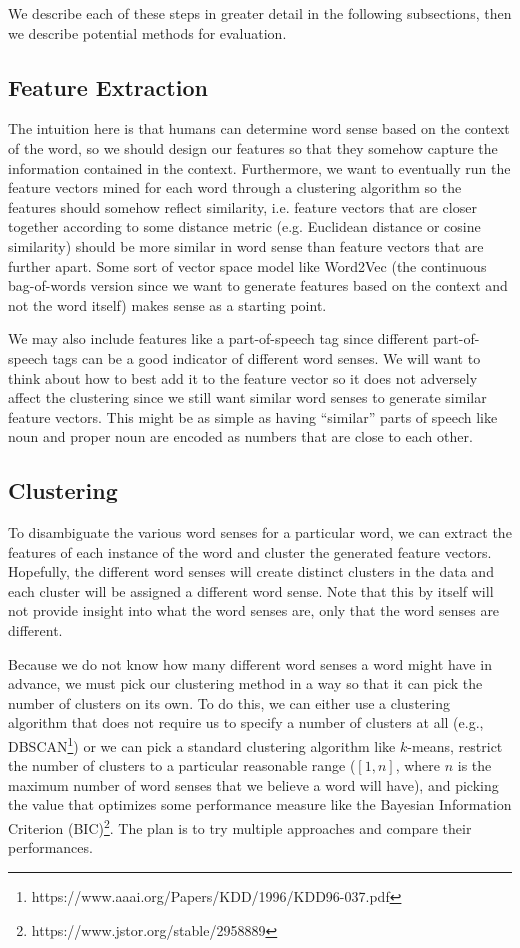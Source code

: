 \documentclass[11pt,letterpaper]{article}
\begin{document}
We describe each of these steps in greater detail in the following subsections, then we describe potential methods for evaluation.

\subsection{Feature Extraction}
The intuition here is that humans can determine word sense based on the context of the word, so we should design our features so that they somehow capture the information contained in the context. Furthermore, we want to eventually run the feature vectors mined for each word through a clustering algorithm so the features should somehow reflect similarity, i.e. feature vectors that are closer together according to some distance metric (e.g. Euclidean distance or cosine similarity) should be more similar in word sense than feature vectors that are further apart. Some sort of vector space model like Word2Vec (the continuous bag-of-words version since we want to generate features based on the context and not the word itself) makes sense as a starting point. 

We may also include features like a part-of-speech tag since different part-of-speech tags can be a good indicator of different word senses. We will want to think about how to best add it to the feature vector so it does not adversely affect the clustering since we still want similar word senses to generate similar feature vectors. This might be as simple as having ``similar'' parts of speech like noun and proper noun are encoded as numbers that are close to each other.

\subsection{Clustering}
To disambiguate the various word senses for a particular word, we can extract the features of each instance of the word and cluster the generated feature vectors. Hopefully, the different word senses will create distinct clusters in the data and each cluster will be assigned a different word sense. Note that this by itself will not provide insight into what the word senses are, only that the word senses are different. 

Because we do not know how many different word senses a word might have in advance, we must pick our clustering method in a way so that it can pick the number of clusters on its own. To do this, we can either use a clustering algorithm that does not require us to specify a number of clusters at all (e.g., DBSCAN\footnote{https://www.aaai.org/Papers/KDD/1996/KDD96-037.pdf}) or we can pick a standard clustering algorithm like $k$-means, restrict the number of clusters to a particular reasonable range ($[1,n]$, where $n$ is the maximum number of word senses that we believe a word will have), and picking the value that optimizes some performance measure like the Bayesian Information Criterion (BIC)\footnote{https://www.jstor.org/stable/2958889}. The plan is to try multiple approaches and compare their performances.
\end{document}
